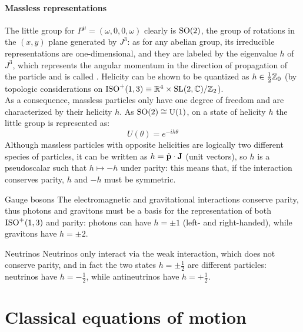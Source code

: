 \paragraph{Massless representations}

The little group for $ P^\mu = (\omega,0,0,\omega) $ clearly is $ \mathrm{SO}(2) $, the group of rotations in the $ (x,y) $ plane generated by $ J^3 $: as for any abelian group, its irreducible representations are one-dimensional, and they are labeled by the eigenvalue $ h $ of $ J^3 $, which represents the angular momentum in the direction of propagation of the particle and is called . Helicity can be shown to be quantized as $ h \in \frac{1}{2}\mathbb{Z}_0 $ (by topologic considerations on $ \mathrm{ISO}^+(1,3) \equiv \mathbb{R}^4 \times \mathrm{SL}(2,\mathbb{C}) / \mathbb{Z}_2 $).\\
As a consequence, massless particles only have one degree of freedom and are characterized by their helicity $ h $. As $ \mathrm{SO}(2) \cong \mathrm{U}(1) $, on a state of helicity $ h $ the little group is represented as:
\begin{equation}
  U(\theta) = e^{-i h \theta}
\end{equation}
Although massless particles with opposite helicities are logically two different species of particles, it can be written as $ h = \hat{\mathbf{p}} \cdot \mathbf{J} $ (unit vectors), so $ h $ is a pseudoscalar such that $ h \mapsto -h $ under parity: this means that, if the interaction conserves parity, $ h $ and $ -h $ must be symmetric.

\begin{example}{Gauge bosons}{}
  The electromagnetic and gravitational interactions conserve parity, thus photons and gravitons must be a basis for the representation of both $ \mathrm{ISO}^+(1,3) $ and parity: photons can have $ h = \pm 1 $ (left- and right-handed), while gravitons have $ h = \pm 2 $.
\end{example}

\begin{example}{Neutrinos}{}
  Neutrinos only interact via the weak interaction, which does not conserve parity, and in fact the two states $ h = \pm \frac{1}{2} $ are different particles: neutrinos have $ h = - \frac{1}{2} $, while antineutrinos have $ h = + \frac{1}{2} $.
\end{example}

\section{Classical equations of motion}

